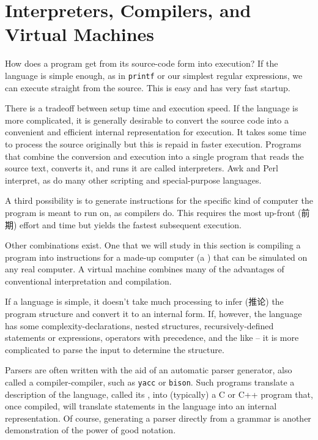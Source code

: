 \section{Interpreters, Compilers, and Virtual Machines}
\label{sec:interpreters_compilers_and_virtual_machines}

How does a program get from its source-code form into execution? If the
language is simple enough, as in \verb'printf' or our simplest regular
expressions, we can execute straight from the source. This is easy and has
very fast startup.

There is a tradeoff between setup time and execution speed. If the language
is more complicated, it is generally desirable to convert the source code
into a convenient and efficient internal representation for execution. It
takes some time to process the source originally but this is repaid in
faster execution. Programs that combine the conversion and execution into a
single program that reads the source text, converts it, and runs it are
called interpreters. Awk and Perl interpret, as do many other scripting and
special-purpose languages.

A third possibility is to generate instructions for the specific kind of
computer the program is meant to run on, as compilers do. This requires the
most up-front (前期) effort and time but yields the fastest subsequent
execution.

Other combinations exist. One that we will study in this section is
compiling a program into instructions for a made-up computer (a
) that can be simulated on any real
computer. A virtual machine combines many of the advantages of conventional
interpretation and compilation.

If a language is simple, it doesn't take much processing to infer (推论)
the program structure and convert it to an internal form. If, however, the
language has some complexity-declarations, nested structures,
recursively-defined statements or expressions, operators with precedence,
and the like -- it is more complicated to parse the input to determine the
structure.

Parsers are often written with the aid of an automatic parser generator,
also called a compiler-compiler, such as \verb'yacc' or \verb'bison'. Such
programs translate a description of the language, called its
, into (typically) a C or C++ program that, once
compiled, will translate statements in the language into an internal
representation. Of course, generating a parser directly from a grammar is
another demonstration of the power of good notation.

